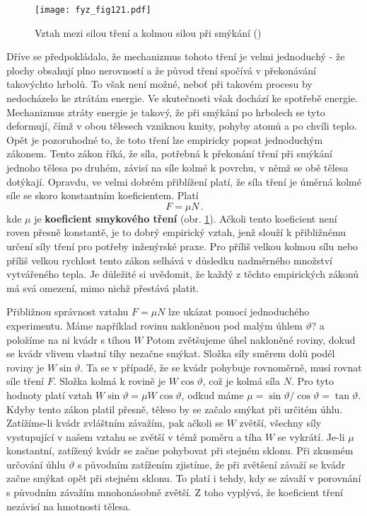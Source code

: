     \begin{figure}[ht!]  %
      \centering
      \texttt{[image: fyz\_fig121.pdf]}
      \caption{Vztah mezi silou tření a kolmou silou při smýkání
              (\cite[s.~173]{Feynman01})}
      \label{fyz:fig121}
    \end{figure}
    Dříve se předpokládalo, že mechanizmus tohoto tření je velmi jednoduchý - že plochy obsahují 
    plno nerovností a že původ tření spočívá v překonávání takovýchto hrbolů. To však není možné, 
    neboť při takovém procesu by nedocházelo ke ztrátám energie. Ve skutečnosti však dochází ke 
    spotřebě energie. Mechanizmus ztráty energie je takový, že při smýkání po hrbolech se tyto 
    deformují, čímž v obou tělesech vzniknou kmity, pohyby atomů a po chvíli teplo. Opět je 
    pozoruhodné to, že toto tření lze empiricky popsat jednoduchým zákonem. Tento zákon říká, že 
    síla, potřebná k překonání tření při smýkání jednoho tělesa po druhém, závisí na síle kolmé k 
    povrchu, v němž se obě tělesa dotýkají. Opravdu, ve velmi dobrém přiblížení platí, že síla 
    tření je úměrná kolmé síle se skoro konstantním koeficientem. Platí
    \begin{equation}\label{FYZ:eq169}
      \boxed{F = \mu N}\,.
    \end{equation}
    kde \(\mu\) je \textbf{koeficient smykového tření} (obr. \ref{fyz:fig121}). Ačkoli tento 
    koeficient není roven přesně konstantě, je to dobrý empirický vztah, jenž slouží k přibližnému 
    určení síly tření pro potřeby inženýrské praxe. Pro příliš velkou kolmou sílu nebo příliš 
    velkou rychlost tento zákon selhává v důsledku nadměrného množství vytvářeného tepla. Je 
    důležité si uvědomit, že každý z těchto empirických zákonů má svá omezení, mimo nichž přestává 
    platit.
    
    Přibližnou správnost vztahu \(F = \mu N\) lze ukázat pomocí jednoduchého experimentu. Máme 
    například rovinu nakloněnou pod malým úhlem \(\vartheta\)? a položíme na ni kvádr s tíhou \(W\) 
    Potom zvětšujeme úhel nakloněné roviny, dokud se kvádr vlivem vlastní tíhy nezačne smýkat. 
    Složka síly směrem dolů podél roviny je \(W\sin\vartheta\). Ta se v případě, že se kvádr 
    pohybuje rovnoměrně, musí rovnat síle tření \(F\). Složka kolmá k rovině je \(W\cos\vartheta\), 
    což je kolmá síla \(N\). Pro tyto hodnoty platí vztah \(W\sin\vartheta = \mu W\cos\vartheta\), 
    odkud máme \(\mu = \sin\vartheta/\cos\vartheta = \tan\vartheta\). Kdyby tento zákon platil 
    přesně, těleso by se začalo smýkat při určitém úhlu. Zatížíme-li kvádr zvláštním závažím, pak 
    ačkoli se \(W\) zvětší, všechny síly vystupující v našem vztahu se zvětší v témž poměru a tíha 
    \(W\) se vykrátí. Je-li \(\mu\) konstantní, zatížený kvádr se začne pohybovat při stejném 
    sklonu. Při zkusmém určování úhlu \(\vartheta\) s původním zatížením zjistíme, že při zvětšení 
    závaží se kvádr začne smýkat opět při stejném sklonu. To platí i tehdy, kdy se závaží v 
    porovnání s původním závažím mnohonásobně zvětší. Z toho vyplývá, že koeficient tření nezávisí 
    na hmotnosti tělesa.
    
